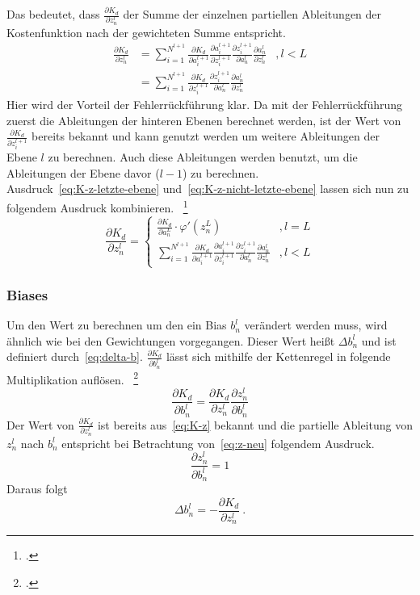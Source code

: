 Das bedeutet, dass $\frac{\partial K_d}{\partial z^l_n}$ der Summe der einzelnen partiellen Ableitungen der Kostenfunktion nach der gewichteten Summe entspricht.
\begin{align}
    \frac{\partial K_d}{\partial z^l_n}
    &= \sum\limits^{N^{l+1}}_{i=1} \frac{\partial K_d}{\partial a^{l+1}_i} \frac{\partial a^{l+1}_i}{\partial z^{l+1}_i} \frac{\partial z^{l+1}_i}{\partial a^l_n} \frac{\partial a^l_n}{\partial z^l_n}&, l < L\\
    &= \sum\limits^{N^{l+1}}_{i=1} \frac{\partial K_d}{\partial z^{l+1}_i} \frac{\partial z^{l+1}_i}{\partial a^l_n} \frac{\partial a^l_n}{\partial z^l_n}
    \label{eq:K-z-nicht-letzte-ebene}
\end{align}
Hier wird der Vorteil der Fehlerrückführung klar.
Da mit der Fehlerrückführung zuerst die Ableitungen der hinteren Ebenen berechnet werden, ist der Wert von $\frac{\partial K_d}{\partial z^{l+1}_i}$ bereits bekannt und kann genutzt werden um weitere Ableitungen der Ebene $l$ zu berechnen.
Auch diese Ableitungen werden benutzt, um die Ableitungen der Ebene davor ($l-1$) zu berechnen.\\
Ausdruck~\eqref{eq:K-z-letzte-ebene} und~\eqref{eq:K-z-nicht-letzte-ebene} lassen sich nun zu folgendem Ausdruck kombinieren.
~\footcite{3b1b-4}
\begin{equation}
    \frac{\partial K_d}{\partial z_n^l} =
    \begin{cases}
        \frac{\partial K_d}{\partial a_n^L} \cdot \varphi'(z^L_n)&, l = L \\
        \sum\limits^{N^{l+1}}_{i=1} \frac{\partial K_d}{\partial a^{l+1}_i} \frac{\partial a^{l+1}_i}{\partial z^{l+1}_i} \frac{\partial z^{l+1}_i}{\partial a^l_n} \frac{\partial a^l_n}{\partial z^l_n}&, l < L
    \end{cases}
    \label{eq:K-z}
\end{equation}

\subsubsection{Biases}
Um den Wert zu berechnen um den ein Bias $b^l_n$ verändert werden muss, wird ähnlich wie bei den Gewichtungen vorgegangen.
Dieser Wert heißt $\Delta b^l_n$ und ist definiert durch~\eqref{eq:delta-b}.
$\frac{\partial K_d}{\partial b^l_n}$ lässt sich mithilfe der Kettenregel in folgende Multiplikation auflösen.
~\footcite{3b1b-4}
\begin{equation}
    \frac{\partial K_d}{\partial b^l_n} = \frac{\partial K_d}{\partial z^l_n} \frac{\partial z^l_n}{\partial b^l_n}
    \label{eq:K-b}
\end{equation}
Der Wert von $\frac{\partial K_d}{\partial z^l_n}$ ist bereits aus~\eqref{eq:K-z} bekannt und die partielle Ableitung von $z^l_n$ nach $b^l_n$ entspricht bei Betrachtung von~\eqref{eq:z-neu} folgendem Ausdruck.
\begin{equation}
    \frac{\partial z^l_n}{\partial b^l_n} = 1
    \label{eq:z-b}
\end{equation}
Daraus folgt
\begin{equation}
    \Delta b^l_n = -\frac{\partial K_d}{\partial z^l_n}~.
    \label{eq:delta-b-neu}
\end{equation}
